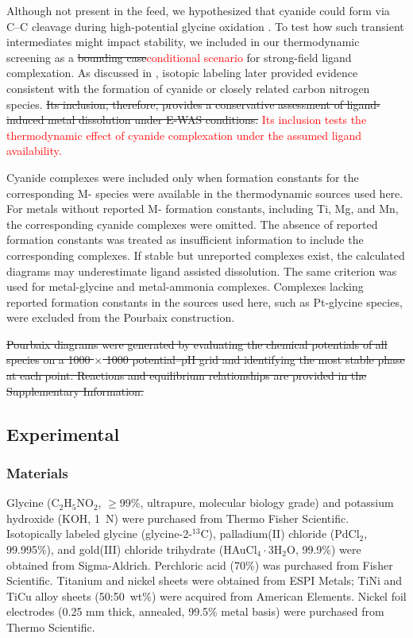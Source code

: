 \documentclass[twoside,twocolumn,9pt]{article}
\begin{document}
Although not present in the feed, we hypothesized that cyanide could form via C–C cleavage during high-potential glycine oxidation \cite{Oraby2020GoldPermanganate, Chen2013AdsorptionStudy}. To test how such transient intermediates might impact stability, we included  in our thermodynamic screening as a \sout{bounding case}\textcolor{red}{conditional scenario} for strong-field ligand complexation. As discussed in , isotopic labeling later provided evidence consistent with the formation of cyanide or closely related carbon nitrogen species. \sout{Its inclusion, therefore, provides a conservative assessment of ligand-induced metal dissolution under E-WAS conditions.} \textcolor{red}{Its inclusion tests the thermodynamic effect of cyanide complexation under the assumed ligand availability.}

Cyanide complexes were included only when formation constants for the corresponding M- species were available in the thermodynamic sources used here. For metals without reported M- formation constants, including Ti, Mg, and Mn, the corresponding cyanide complexes were omitted. The absence of reported formation constants was treated as insufficient information to include the corresponding complexes. If stable but unreported complexes exist, the calculated diagrams may underestimate ligand assisted dissolution. The same criterion was used for metal-glycine and metal-ammonia complexes. Complexes lacking reported formation constants in the sources used here, such as Pt-glycine species, were excluded from the Pourbaix construction.

\sout{Pourbaix diagrams were generated by evaluating the chemical potentials of all species on a 1000 $\times$ 1000 potential–pH grid and identifying the most stable phase at each point. Reactions and equilibrium relationships are provided in the Supplementary Information.}

\subsection{Experimental}
\subsubsection{Materials}
Glycine (C$_2$H$_5$NO$_2$, $\geq$99\%, ultrapure, molecular biology grade) and potassium hydroxide (KOH, 1~N) were purchased from Thermo Fisher Scientific. Isotopically labeled glycine (glycine-2-$^{13}$C), palladium(II) chloride (PdCl$_2$, 99.995\%), and gold(III) chloride trihydrate (HAuCl$_4\cdot$3H$_2$O, 99.9\%) were obtained from Sigma-Aldrich. Perchloric acid (70\%) was purchased from Fisher Scientific. Titanium and nickel sheets were obtained from ESPI Metals; TiNi and TiCu alloy sheets (50:50~wt\%) were acquired from American Elements. Nickel foil electrodes (0.25 mm thick, annealed, 99.5\% metal basis) were purchased from Thermo Scientific.
\end{document}
